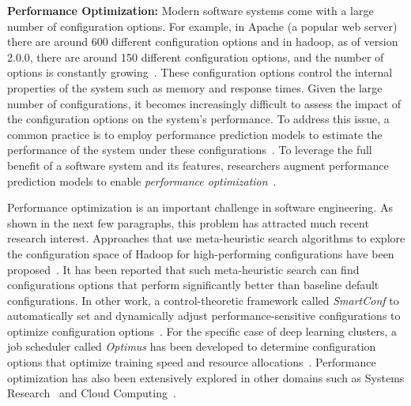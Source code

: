 \documentclass[10pt,journal,compsoc]{IEEEtran}
\begin{document}
\noindent\textbf{Performance Optimization: }Modern software systems come with a large number of configuration options. 
For example, in {\sc Apache} (a popular web server) there are around 600 
different configuration options and in {\sc hadoop}, as of version 2.0.0, there are around 150 different configuration options, and the number of options is constantly growing~\cite{xu2015hey}. These configuration options control the 
internal 
properties of the system such as memory and response times. Given the large number of configurations, it becomes increasingly difficult to assess the impact of the configuration options on the system's performance. To address this issue, a common practice is to employ performance prediction models to estimate the performance of the system under these 
configurations~\cite{guo2013variability, hoste2006, hutter2014, thereska2010, 
valov2015, westermann12}. To leverage the full benefit of a software system and its features, researchers augment performance prediction models to enable
\textit{performance 
optimization}~\cite{nair2017using,oh2017finding}.

Performance optimization is an important challenge in software engineering. As shown in the next few paragraphs, this problem has attracted much recent research interest. Approaches 
that use meta-heuristic 
search algorithms to explore the configuration space of Hadoop for high-performing configurations have been proposed~\cite{tang2018searching}. 
It has been reported that such meta-heuristic search can find configurations options that perform significantly better than baseline default configurations. 
In other work, a
control-theoretic framework called \textit{SmartConf} to automatically set and 
dynamically adjust performance-sensitive configurations to optimize 
configuration options~\cite{wang2018understanding}. For the specific case of 
deep learning clusters, a job scheduler called 
\textit{Optimus} has been developed to determine
configuration options that optimize training speed and resource 
allocations~\cite{peng2018optimus}. Performance optimization has also been extensively explored in other domains 
such as Systems Research~\cite{zhu2017bestconfig, li2018understanding} 
and Cloud Computing~\cite{alipourfard2017cherrypick, yadwadkar2017selecting, 
hsu2017low, Hsu2018scout, hsu2018micky}.
\end{document}
